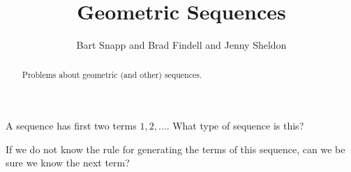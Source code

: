 \documentclass[nooutcomes]{ximera}
\title{Geometric Sequences}
\author{Bart Snapp and Brad Findell and Jenny Sheldon}
\begin{document}
\begin{abstract}
Problems about geometric (and other) sequences.
\end{abstract}
\maketitle





\begin{problem}
A sequence has first two terms $1, 2, \dots$.  What type of sequence is this?
\begin{multipleChoice}
\end{multipleChoice}
\begin{hint}
	If we do not know the rule for generating the terms of this sequence, can we be sure we know the next term?
\end{hint}
\end{problem}
\end{document}
